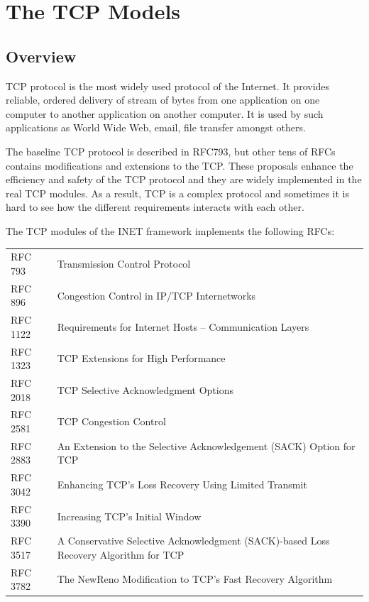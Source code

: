 \chapter{The TCP Models}
\label{cha:tcp}


\section{Overview}

TCP protocol is the most widely used protocol of the Internet. It provides
reliable, ordered delivery of stream of bytes from one application on one computer
to another application on another computer. It is used by such applications as
World Wide Web, email, file transfer amongst others.

The baseline TCP protocol is described in RFC793, but other tens of RFCs
contains modifications and extensions to the TCP. These proposals
enhance the efficiency and safety of the TCP protocol and they are widely
implemented in the real TCP modules. As a result, TCP is a complex protocol
and sometimes it is hard to see how the different requirements interacts
with each other.

The TCP modules of the INET framework implements the following RFCs:

\begin{tabular}{ll}
RFC 793 & Transmission Control Protocol \\
RFC 896 & Congestion Control in IP/TCP Internetworks \\
RFC 1122 & Requirements for Internet Hosts -- Communication Layers \\
RFC 1323 & TCP Extensions for High Performance \\ 
RFC 2018 & TCP Selective Acknowledgment Options \\
RFC 2581 & TCP Congestion Control \\
RFC 2883 & An Extension to the Selective Acknowledgement (SACK) Option for TCP \\
RFC 3042 & Enhancing TCP's Loss Recovery Using Limited Transmit \\
RFC 3390 & Increasing TCP's Initial Window \\
RFC 3517 & A Conservative Selective Acknowledgment (SACK)-based Loss Recovery \newline
                 Algorithm for TCP \\
RFC 3782 & The NewReno Modification to TCP's Fast Recovery Algorithm \\
\end{tabular}


